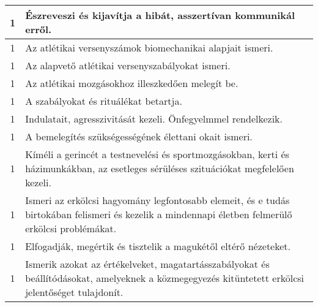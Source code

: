 \begin{longtable}{c | p{12cm} }
                                          1 &  Észreveszi és kijavítja a hibát, asszertívan kommunikál erről. \\ \hline
                                          1 &  Az atlétikai versenyszámok biomechanikai alapjait ismeri. \\ \hline
                                          1 &  Az alapvető atlétikai versenyszabályokat ismeri. \\ \hline
                                          1 &  Az atlétikai mozgásokhoz illeszkedően melegít be. \\ \hline
                                          1 &  A szabályokat és rituálékat betartja. \\ \hline
                                          1 &  Indulatait, agresszivitását kezeli. Önfegyelmmel rendelkezik. \\ \hline
                                          1 &  A bemelegítés szükségességének élettani okait ismeri. \\ \hline
                                          1 &  Kíméli a gerincét a testnevelési és sportmozgásokban, kerti és házimunkákban, az esetleges sérüléses szituációkat megfelelően kezeli. \\ \hline
                                          1 &  Ismeri az erkölcsi hagyomány legfontosabb elemeit, és e tudás birtokában felismeri és kezelik a mindennapi életben felmerülő erkölcsi problémákat. \\ \hline
                                          1 &  Elfogadják, megértik és tisztelik a magukétől eltérő nézeteket. \\ \hline
                                          1 &  Ismerik azokat az értékelveket, magatartásszabályokat és beállítódásokat, amelyeknek a közmegegyezés kitüntetett erkölcsi jelentőséget tulajdonít. \\ \hline
                                      

\end{longtable}
